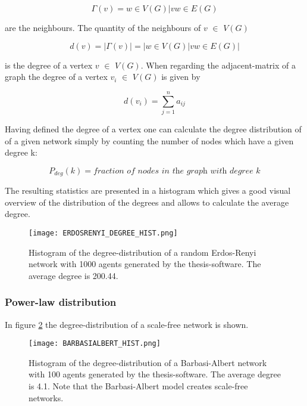 \documentclass[../Bachelorarbeit.tex]{subfiles}
\begin{document}
\begin{equation}
\Gamma(v) = {w \in V(G) | vw \in E(G)}
\end{equation}

are the neighbours. The quantity of the neighbours of $v$ $\in$ $V(G)$ 

\begin{equation}
d(v) = |\Gamma(v)| = |{w \in V(G) | vw \in E(G)}|
\end{equation}

is the degree of a vertex $v$ $\in$ $V(G)$. When regarding the adjacent-matrix of a graph the degree of a vertex $v_i$ $\in$ $V(G)$ is given by

\begin{equation}
d(v_i) = \displaystyle\sum_{j=1}^{n} a_{ij}
\end{equation}

Having defined the degree of a vertex one can calculate the degree distribution of of a given network simply by counting the number of nodes which have a given degree k:

\begin{equation}
P_{deg}(k) = \textit{fraction of nodes in the graph with degree k}
\end{equation}

The resulting statistics are presented in a histogram which gives a good visual overview of the distribution of the degrees and allows to calculate the average degree. 

\begin{figure}[H]
	\centering
  \texttt{[image: ERDOSRENYI\_DEGREE\_HIST.png]}
  	\caption{Histogram of the degree-distribution of a random Erdos-Renyi network with 1000 agents generated by the thesis-software. The average degree is 200.44.}
	\label{fig:ERDOSRENYI_DEGREE_HIST}
\end{figure}

\subsubsection{Power-law distribution}
In figure \ref{fig:BARBASIALBERT_HIST} the degree-distribution of a scale-free network is shown.

\begin{figure}[H]
	\centering
  \texttt{[image: BARBASIALBERT\_HIST.png]}
  	\caption{Histogram of the degree-distribution of a Barbasi-Albert network with 100 agents generated by the thesis-software. The average degree is 4.1. Note that the Barbasi-Albert model creates scale-free networks.}
	\label{fig:BARBASIALBERT_HIST}
\end{figure}
\end{document}
